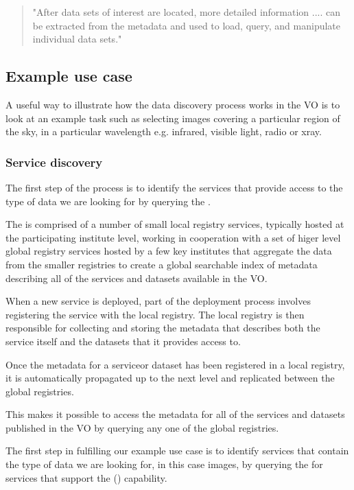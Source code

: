 \documentclass{article}
\begin{document}
\begin{quote}
"After data sets of interest are located, more detailed information
.... can be extracted from the metadata and used to load, query, and
manipulate individual data sets."
\end{quote}

\subsection{Example use case}

A useful way to illustrate how the data discovery process works in the VO
is to look at an example task such as selecting images covering a particular
region of the sky, in a particular wavelength e.g. infrared, visible light,
radio or xray.

\subsubsection{Service discovery}

The first step of the process is to identify the services that provide access to
the type of data we are looking for by querying the \cite{ivoa.reg}.

The \cite{ivoa.reg} is comprised of a number of small local registry services,
typically hosted at the participating institute level, working in cooperation
with a set of higer level global registry services hosted by a few key institutes
that aggregate the data from the smaller registries to create a global searchable
index of metadata describing all of the services and datasets available in
the VO.

When a new service is deployed, part of the deployment process involves
registering the service with the local registry. The local registry is then
responsible for collecting and storing the metadata that describes both the
service itself and the datasets that it provides access to.

Once the metadata for a serviceor dataset has been registered in a local registry,
it is automatically propagated up to the next level and replicated between the
global registries.

This makes it possible to access the metadata for all of the services and datasets
published in the VO by querying any one of the global registries.

The first step in fulfilling our example use case is to identify services that
contain the type of data we are looking for, in this case images, by querying
the \cite{ivoa.reg} for services that support the 
(\cite{ivoa.sia}) capability.
\end{document}
